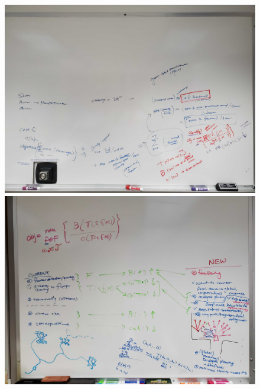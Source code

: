 \documentclass[letterpaper, 10 pt, conference]{ieeeconf}  %
\begin{document}
\clearpage
\begin{figure}[H]
  \centering
  \includegraphics[width=.9\textwidth]{figures/whiteboardA.jpg}
  \includegraphics[width=.9\textwidth]{figures/whiteboardB.jpg}
\end{figure}
\clearpage
\end{document}
